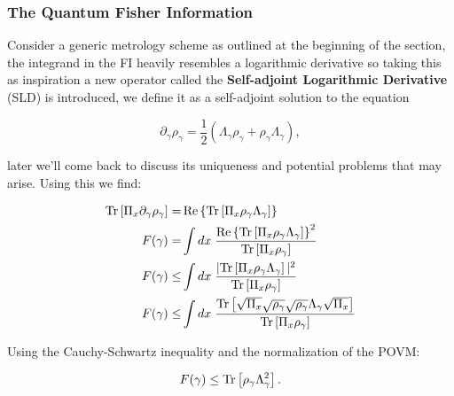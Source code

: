 \subsubsection{The Quantum Fisher Information}
Consider a generic metrology scheme as outlined at the beginning of
the section, the integrand in the FI heavily resembles a logarithmic derivative so taking
this as inspiration a new operator called the \textbf{Self-adjoint
  Logarithmic Derivative} (SLD) is introduced,  we define it as
a self-adjoint solution to the equation

\begin{equation}
  \partial_{\gamma}\rho_{\gamma} = \frac{1}{2}\left(\Lambda_{\gamma}\rho_{\gamma} + \rho_{\gamma}\Lambda_{\gamma} \right),
\end{equation}

later we'll come back to discuss its uniqueness and potential
problems that may arise. Using this we find:

\begin{align}
  \mathrm{Tr}\left[\Pi_{x}\partial_{\gamma}\rho_{\gamma}\right] =& \operatorname{Re}\left\{\mathrm{Tr}\left[\Pi_{x}\rho_{\gamma}\Lambda_{\gamma}\right]\right\}\\
   F(\gamma) =& \int dx\hspace{0.1cm} \frac{\operatorname{Re}\left\{\mathrm{Tr}\left[\Pi_{x}\rho_{\gamma}\Lambda_{\gamma}\right]\right\}^{2}}{\mathrm{Tr}\left[\Pi_{x}\rho_{\gamma}\right]}\\
   F(\gamma) \leq& \int dx\hspace{0.1cm} \frac{|\mathrm{Tr}\left[\Pi_{x}\rho_{\gamma}\Lambda_{\gamma}\right]|^{2}}{\mathrm{Tr}\left[\Pi_{x}\rho_{\gamma}\right]}\\
   F(\gamma) \leq& \int dx\hspace{0.1cm} \frac{\mathrm{Tr}\left[\sqrt{\Pi_{x}}\sqrt{\rho_{\gamma}}\sqrt{\rho_{\gamma}}\Lambda_{\gamma}\sqrt{\Pi_{x}}\right]}{\mathrm{Tr}\left[\Pi_{x}\rho_{\gamma}\right]}\\
\end{align}

Using the Cauchy-Schwartz inequality and the normalization of the POVM:

\begin{equation}
F(\gamma) \leq  \mathrm{Tr}\left[\rho_{\gamma}\Lambda_{\gamma}^{2}\right].
\end{equation}
